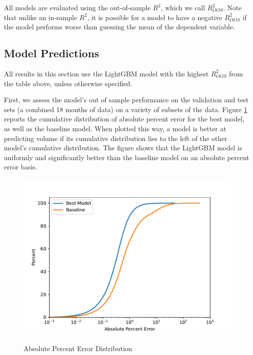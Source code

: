 \documentclass[12pt]{article}
\begin{document}
All models are evaluated using the out-of-sample $R^2$, which we call $R^2_{OOS}$. Note that unlike an in-sample $R^2$, it is possible for a model to have a negative $R^2_{OOS}$ if the model performs worse than guessing the mean of the dependent variable.



\subsection{Model Predictions}
All results in this section use the LightGBM model with the highest $R^2_{OOS}$ from the table above, unless otherwise specified.

First, we assess the model's out of sample performance on the validation and test sets (a combined 18 months of data) on a variety of subsets of the data. Figure \ref{fig:absolute_percent_error_distribution} reports the cumulative distribution of absolute percent error for the best model, as well as the baseline model. When plotted this way, a model is better at predicting volume if its cumulative distribution lies to the left of the other model's cumulative distribution. The figure shows that the LightGBM model is uniformly and significantly better than the baseline model on an absolute percent error basis.

\begin{figure}[H]
    \centering
    \caption{Absolute Percent Error Distribution}
    \includegraphics[width=0.75\linewidth]{../Output/absolute_percent_error_distribution.pdf}
    \label{fig:absolute_percent_error_distribution}
\end{figure}
\end{document}
